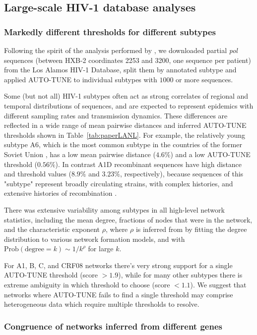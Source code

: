 \documentclass[utf8]{FrontiersinHarvard} %
\begin{document}
\subsection{Large-scale HIV-1 database analyses}

\subsubsection{Markedly different thresholds for different subtypes}
Following the spirit of the analysis performed by \citet{Wertheim:2014aa}, we
downloaded partial {\it pol} sequences (between HXB-2 coordinates 2253 and
3200, one sequence per patient) from the Los Alamos HIV-1 Database, split them
by annotated subtype and applied AUTO-TUNE to individual subtypes with $1000$
or more sequences.

Some (but not all) HIV-1 subtypes often act as strong correlates of regional
and temporal distributions of sequences, and are expected to represent
epidemics with different sampling rates and transmission dynamics. These
differences are reflected in a wide range of mean pairwise distances and
inferred AUTO-TUNE thresholds shown in Table~\ref{tab:paperLANL}. For example,
the relatively young subtype A6, which is the most common subtype in the
countries of the former Soviet Union \cite{Abidi:2021aa}, has a low mean
pairwise distance ($4.6\%$) and a low AUTO-TUNE threshold ($0.56\%$). In
contrast A1D recombinant sequences have high distance and threshold values
($8.9\%$ and $3.23\%$, respectively), because sequences of this "subtype"
represent broadly circulating strains, with complex histories, and extensive
histories of recombination \cite{Foster:2014aa,Yebra:2015aa}.

There was extensive variability among subtypes in all high-level network
statistics, including the mean degree, fractions of nodes that were in the
network, and the characteristic exponent $\rho$, where $\rho$ is inferred from
by fitting the degree distribution to various network formation models, and
with $\text{Prob}(\text{degree} = k) \sim 1/k^\rho$ for large $k$.

For A1, B, C, and CRF08 networks there's very strong support for a single
AUTO-TUNE threshold (score $>1.9$), while for many other subtypes there is
extreme ambiguity in which threshold to choose (score $<1.1$). We suggest that
networks where AUTO-TUNE fails to find a single threshold may comprise
heterogeneous data which require multiple thresholds to resolve.

\subsubsection{Congruence of networks inferred from different genes}
\end{document}
